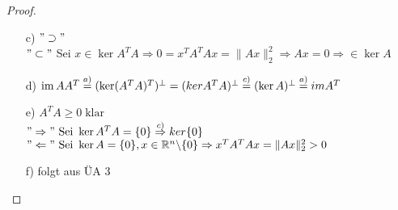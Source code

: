 \begin{proof}\hfill
\begin{itemize}
\item[c)]$"\supset"$ \; \\
$" \subset" $ Sei $x \in \ker A^TA \Rightarrow 0=x^TA^TAx=\|Ax\|_2^{2} \Rightarrow Ax=0 \Rightarrow \in \ker A$
\item[d)]$\operatorname*{\mathrm{im}} AA^T \overset{a)}{=} (\ker(A^TA)^T)^{\perp} = (ker A^TA)^{\perp} \overset{c)}{=} (\ker A)^{\perp} \overset{a)}{=} im A^T$
\item[e)]$A^TA\ge 0  \; \text{klar}$\\$" \Rightarrow"\text{ Sei } \ker A^TA =\{0\} \overset{c)}{\Rightarrow}ker\{0\}$\\$"\Leftarrow" \text{ Sei } \ker A=\{0\}, x\in \mathbb R^n\backslash\{0\} \Rightarrow x^TA^TAx = \|Ax\|_2^{2} > 0$
\item[f)] folgt aus ÜA 3
\end{itemize}
\end{proof}
